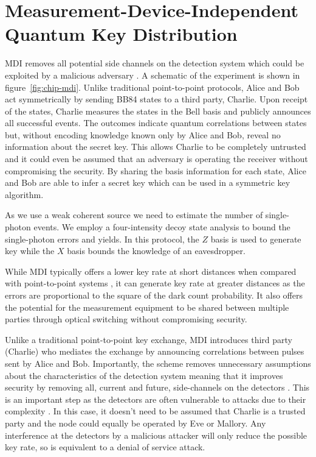 \section{Measurement-Device-Independent Quantum Key Distribution}
\label{sec:mdi-qkd}

\Ac{MDI} removes all potential side channels on the detection system which could be exploited by a malicious adversary \cite{mdi-qkd}. A schematic of the experiment is shown in figure~\ref{fig:chip-mdi}. Unlike traditional point-to-point protocols, Alice and Bob act symmetrically by sending BB84 states to a third party, Charlie. Upon receipt of the states, Charlie measures the states in the Bell basis and publicly announces all successful events. The outcomes indicate quantum correlations between states but, without encoding knowledge known only by Alice and Bob, reveal no information about the secret key. This allows Charlie to be completely untrusted and it could even be assumed that an adversary is operating the receiver without compromising the security. By sharing the basis information for each state, Alice and Bob are able to infer a secret key which can be used in a symmetric key algorithm. 

As we use a weak coherent source we need to estimate the number of single-photon events. We employ a four-intensity decoy state analysis \cite{zhou2016} to bound the single-photon errors and yields. In this protocol, the $Z$ basis is used to generate key while the $X$ basis bounds the knowledge of an eavesdropper. 

While \ac{MDI} typically offers a lower key rate at short distances when compared with point-to-point systems \cite{Sibson2017InP}, it can generate key rate at greater distances \cite{yin2016} as the errors are proportional to the square of the dark count probability. It also offers the potential for the measurement equipment to be shared between multiple parties through optical switching without compromising security.

Unlike a traditional point-to-point key exchange, \ac{MDI} introduces third party (Charlie) who mediates the exchange by announcing correlations between pulses sent by Alice and Bob. Importantly, the scheme removes unnecessary assumptions about the characteristics of the detection system meaning that it improves security by removing all, current and future, side-channels on the detectors \cite{mdi-qkd}. This is an important step as the detectors are often vulnerable to attacks due to their complexity \cite{Lydersen2010a, Makarov2006}. In this case, it doesn't need to be assumed that Charlie is a trusted party and the node could equally be operated by Eve or Mallory. Any interference at the detectors by a malicious attacker will only reduce the possible key rate, so is equivalent to a denial of service attack.

